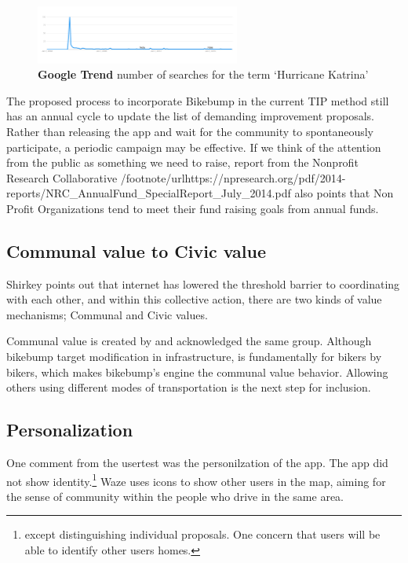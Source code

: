 {\begin{figure}[!htb]
\includegraphics[width=0.6\textwidth]{chapters/5/fig/katrina_trend.png}
\caption[Trend for hurricane Katrina]{\textbf{Google Trend} number of searches for the term `Hurricane
Katrina'}
\label{fig:katrina_trend}
\end{figure}

The proposed process to incorporate Bikebump in the current TIP method still
has an annual cycle to update the list of demanding improvement proposals. Rather than releasing the app and
wait for the community to spontaneously participate, a periodic campaign
may be effective. If we think of the attention from the public as something
we need to raise, report from the Nonprofit Research Collaborative 
/footnote{/url{https://npresearch.org/pdf/2014-reports/NRC_AnnualFund_SpecialReport_July_2014.pdf}}
also points that Non Profit Organizations tend to meet their fund raising
goals from annual funds.


\subsection{Communal value to Civic value}
Shirkey points out that internet has lowered
the threshold barrier to coordinating with each other, and within this
collective action, there are two kinds of value mechanisms; Communal and
Civic values.\cite{shirky2010cognitive}

Communal value is created by and acknowledged
the same group. Although bikebump target modification in infrastructure, is
fundamentally for bikers by bikers, which makes bikebump's engine the communal value
behavior. Allowing others using different modes of transportation is the
next step for inclusion.

\subsection{Personalization}
One comment from the usertest was the personilzation of the app. The app
did not show identity.\footnote{except distinguishing individual proposals.
One concern that users will be able to identify other users homes.} Waze
uses icons to show other users in the map, aiming for the sense of
community within the people who drive in the same area.

}
